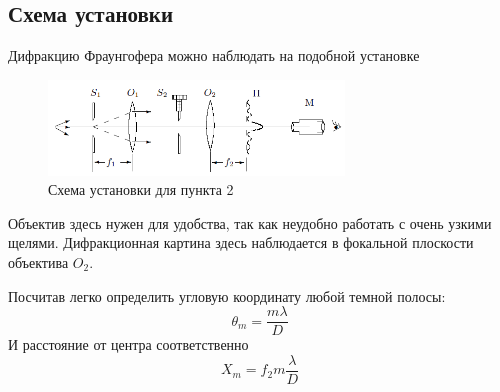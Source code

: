 \documentclass[a4paper, 12pt]{article}%
\begin{document}
\subsection*{Схема установки}
Дифракцию Фраунгофера можно наблюдать на подобной установке 

\begin{figure}[h]
\begin{center}
\includegraphics[width = 0.7\textwidth]{3.png}
\caption{Схема установки для пункта 2}
\end{center}
\end{figure}

Объектив здесь нужен для удобства, так как неудобно работать с очень узкими щелями. Дифракционная картина здесь наблюдается в фокальной плоскости объектива $O_2$. 

Посчитав легко определить угловую координату любой темной полосы:
\begin{equation}
\theta_m = \frac{m \lambda}{D}
\end{equation}
И расстояние от центра соответственно 
\begin{equation}
X_m = f_2m\frac{\lambda}{D}
\end{equation}
\end{document}
